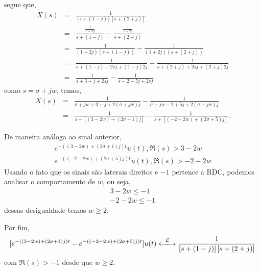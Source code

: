 \documentclass[9pt]{beamer}
\begin{document}
 \begin{frame}
   segue que,
 \begin{eqnarray}  
  X(s) & \equal & \frac {1} { \left [ s + (1 -j) \right] \left [s + (2 + j) \right]} \nonumber \\ 
  & \equal & \frac {\frac {1} {1+ 2j}} { s + (1 -j)} - \frac {\frac {1} {1+ 2j}} {s + (2 +j)} \nonumber \\ 
  & \equal & \frac {1} {(1 + 2j) (s + (1 -j))} - \frac {1} {(1 + 2j) (s + (2 + j))} \nonumber \\
  & \equal & \frac {1} {s + (1 - j) + 2sj + (1 - j)2j} - \frac {1} {s + (2 + j) + 2sj + (2 + j)2j}  \nonumber \\  
  & \equal & \frac {1} { s + 3 +j + 2sj} - \frac {1} { s - 2 + 5j + 2sj } \nonumber  
\end{eqnarray}
como $ s \equal \sigma + jw $, temos, 
\begin{eqnarray}
  X(s) & \equal & \frac {1} { \sigma + jw + 3 + j + 2 (\sigma + jw)j} -\frac {1} {\sigma + jw - 2 + 5j + 2( \sigma + jw)j} \nonumber \\
  & \equal &  \frac {1} {s + [(3 -2w) + (2 \sigma + 1)j]}  -\frac {1} {s + [(-2 -2w ) + (2 \sigma + 5)j]}. \nonumber 
\end{eqnarray}
 \end{frame}
 \begin{frame}
   De maneira an\'{a}loga ao sinal anterior,
\begin{eqnarray}
  e^{-(( 3 - 2w) + (2 \sigma + 1)j)t} u(t) ,\Re(s) > 3 - 2w \nonumber \\
  e^{-(( -2 -2w) + (2 \sigma + 5 )j)t}u(t), \Re(s) >-2 -2w \nonumber
\end{eqnarray}
Usando o fato que os sinais s\~{a}o laterais direitos e $-1$ pertence a RDC, podemos analisar o comportamento de $w$, ou seja,
\begin{eqnarray}
  3 -2w \leq -1  \nonumber \\
  -2 -2w \leq -1 \nonumber   
\end{eqnarray}
dessas  desigualdade temos $ w \geq 2$.
\par
Por fim,
$$[e^{-(( 3 - 2w) + (2 \sigma + 1)j)t} - e^{-(( -2 -2w) + (2 \sigma + 5 )j)t}]u(t) \xlongleftrightarrow{\mathcal{L}}   \frac {1} { \left [ s + (1 -j) \right] \left [s + (2 + j) \right]}$$
com $ \Re(s) > -1$ desde que $ w \geq 2$.
 \end{frame}
\end{document}

